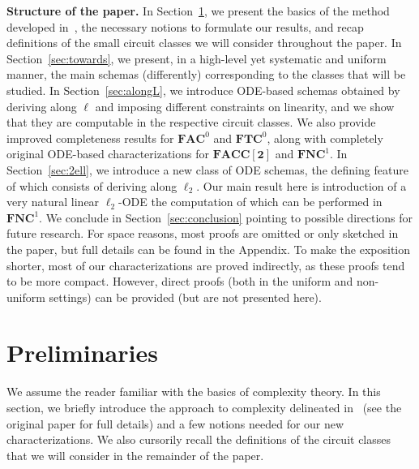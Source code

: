 \documentclass[11pt, oneside]{article}
\newcommand{\NC}{\mathbf{FNC}}
\newcommand{\AC}{\mathbf{FAC}}
\newcommand{\TC}{\mathbf{FTC}}
\newcommand{\FACC}{\mathbf{FACC[2]}}
\theoremstyle{definition}
\begin{document}
\textbf{Structure of the paper.}
In Section~\ref{sec:preliminaries}, we present the basics of the method developed in~\cite{BournezDurand19}, the necessary notions to formulate our results, and recap definitions of the small circuit classes we will consider throughout the paper.
%
In Section~\ref{sec:towards}, we present, in a high-level yet systematic and uniform manner, the main schemas (differently) corresponding to the classes that will be studied.
%
In Section~\ref{sec:alongL}, we introduce ODE-based schemas obtained by deriving along $\ell$ and imposing different constraints on linearity, and we show that they are computable in the respective circuit classes.
%
We also provide improved completeness results for $\AC^0$ and $\TC^0$, along with completely original ODE-based characterizations for $\FACC$ and $\NC^1$.
%
In Section~\ref{sec:2ell}, we introduce a new class of ODE schemas, the defining feature of which consists of deriving along $\ell_2$.
%
Our main result here is introduction of a very natural linear $\ell_2$-ODE the computation of which can be performed in $\NC^1$.
%
We conclude in Section~\ref{sec:conclusion} pointing to possible directions for future research.
For space reasons, most proofs are omitted or only sketched in the paper,  but full details can be found in the Appendix. 
%
To make the exposition shorter, most of our characterizations are proved indirectly, %
as these proofs tend to be more compact.
%
However, direct proofs (both in the uniform and non-uniform settings) can be provided (but are not presented here).














\section{Preliminaries}\label{sec:preliminaries}

We assume the reader familiar with the basics of complexity theory.
%
In this section, we briefly introduce the approach to complexity delineated in~\cite{BournezDurand23} (see the original paper for full details) and a few notions needed for our new characterizations.
%
We also cursorily recall the definitions of the circuit classes that we will consider in the remainder of the paper.
\end{document}
